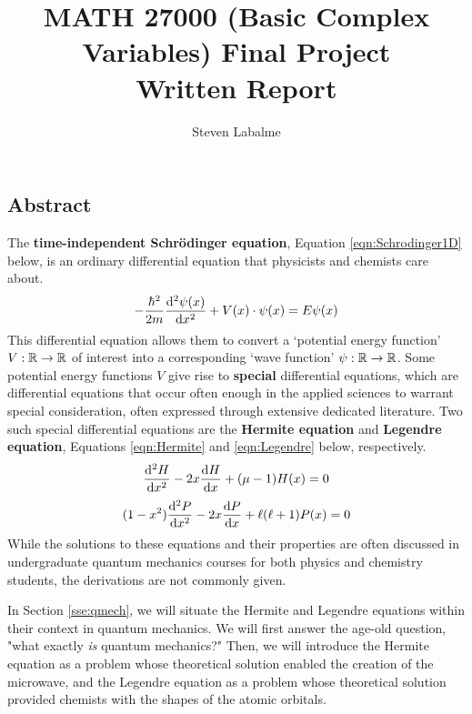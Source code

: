 \documentclass[titlepage]{article}
\title{
    MATH 27000 (Basic Complex Variables) Final Project\\
    Written Report
}
\author{Steven Labalme}
\numberwithin{equation}{section}
\begin{document}
\renewcommand{\thepage}{C}
\maketitle



\tableofcontents
\newpage



\pagestyle{main}
\renewcommand{\leftmark}{Abstract}
\begin{center}
    \section*{Abstract}
\end{center}
The \textbf{time-independent Schr\"{o}dinger equation}, Equation \ref{eqn:Schrodinger1D} below, is an ordinary differential equation that physicists and chemists care about.
\begin{equation}\label{eqn:Schrodinger1D}
    -\frac{\hbar^2}{2m}\dv[2]{\psi(x)}{x}+V(x)\cdot\psi(x) = E\psi(x)
\end{equation}
This differential equation allows them to convert a `potential energy function' $V:\mathbb{R}\to\mathbb{R}$ of interest into a corresponding `wave function' $\psi:\mathbb{R}\to\mathbb{R}$. Some potential energy functions $V$ give rise to \textbf{special} differential equations, which are differential equations that occur often enough in the applied sciences to warrant special consideration, often expressed through extensive dedicated literature. Two such special differential equations are the \textbf{Hermite equation} and \textbf{Legendre equation}, Equations \ref{eqn:Hermite} and \ref{eqn:Legendre} below, respectively.
\begin{equation}\label{eqn:Hermite}
    \dv[2]{H}{x}-2x\dv{H}{x}+(\mu-1)H(x) = 0
\end{equation}
\begin{equation}\label{eqn:Legendre}
    (1-x^2)\dv[2]{P}{x}-2x\dv{P}{x}+\ell(\ell+1)P(x) = 0
\end{equation}
While the solutions to these equations and their properties are often discussed in undergraduate quantum mechanics courses for both physics and chemistry students, the derivations are not commonly given.\par
In Section \ref{sse:qmech}, we will situate the Hermite and Legendre equations within their context in quantum mechanics. We will first answer the age-old question, "what exactly \emph{is} quantum mechanics?" Then, we will introduce the Hermite equation as a problem whose theoretical solution enabled the creation of the microwave, and the Legendre equation as a problem whose theoretical solution provided chemists with the shapes of the atomic orbitals.\par
\end{document}
